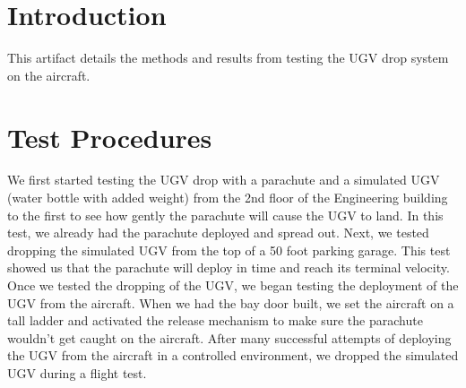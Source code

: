 \documentclass[]{auvsi_doc}
\begin{document}
\begin{AUVSITitlePage}
\begin{artifacttable} 
\end{artifacttable}
\end{AUVSITitlePage}


\section*{Introduction}
This artifact details the methods and results from testing the UGV drop system on the aircraft.

\section*{Test Procedures}
We first started testing the UGV drop with a parachute and a simulated UGV (water bottle with added weight) from the 2nd floor of the Engineering building to the first to see how gently the parachute will cause the UGV to land.
In this test, we already had the parachute deployed and spread out.
Next, we tested dropping the simulated UGV from the top of a 50 foot parking garage. This test showed us that the parachute will deploy in time and reach its terminal velocity.
Once we tested the dropping of the UGV, we began testing the deployment of the UGV from the aircraft.
When we had the bay door built, we set the aircraft on a tall ladder and activated the release mechanism to make sure the parachute wouldn't get caught on the aircraft.
After many successful attempts of deploying the UGV from the aircraft in a controlled environment, we dropped the simulated UGV during a flight test.
\end{document}
